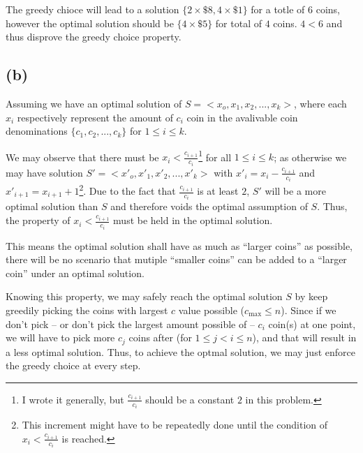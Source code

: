 \documentclass[11pt]{article}
\begin{document}
The greedy chioce will lead to a solution $\{2 \times \$8, 4 \times \$1\}$ for a totle of $6$ coins, however the optimal solution should be $\{4 \times \$5\}$ for total of $4$ coins. $4 < 6$ and thus disprove the greedy choice property.

\subsection{(b)}

Assuming we have an optimal solution of $S = <x_o, x_1, x_2, ..., x_k>$, where each $x_i$ respectively represent the amount of $c_i$ coin in the avalivable coin denominations $\{c_1, c_2, ..., c_k\}$ for $1 \leq i \leq k$.\newline

We may observe that there must be $x_i < \frac{c_{i+1}}{c_i}$\footnote{I wrote it generally, but $\frac{c_{i+1}}{c_i}$ should be a constant $2$ in this problem.} for all $1 \leq i \leq k$; as otherwise we may have solution $S' = <x'_o, x'_1, x'_2, ..., x'_k>$ with $x'_i = x_i - \frac{c_{i+1}}{c_i}$ and $x'_{i+1} = x_{i+1} + 1$\footnote{This increment might have to be repeatedly done until the condition of $x_i < \frac{c_{i+1}}{c_i}$ is reached.}. Due to the fact that $\frac{c_{i+1}}{c_i}$ is at least $2$, $S'$ will be a more optimal solution than $S$ and therefore voids the optimal assumption of $S$. Thus, the property of $x_i < \frac{c_{i+1}}{c_i}$ must be held in the optimal solution.

This means the optimal solution shall have as much as ``larger coins'' as possible, there will be no scenario that mutiple ``smaller coins'' can be added to a ``larger coin'' under an optimal solution.\newline

Knowing this property, we may safely reach the optimal solution $S$ by keep greedily picking the coins with largest $c$ value possible ($c_{\text{max}} \leq n$). Since if we don't pick -- or don't pick the largest amount possible of -- $c_i$ coin(s) at one point, we will have to pick more $c_j$ coins after (for $1 \leq j < i \leq n$), and that will result in a less optimal solution. Thus, to achieve the optmal solution, we may just enforce the greedy choice at every step.

%
% 
% 
\end{document}
